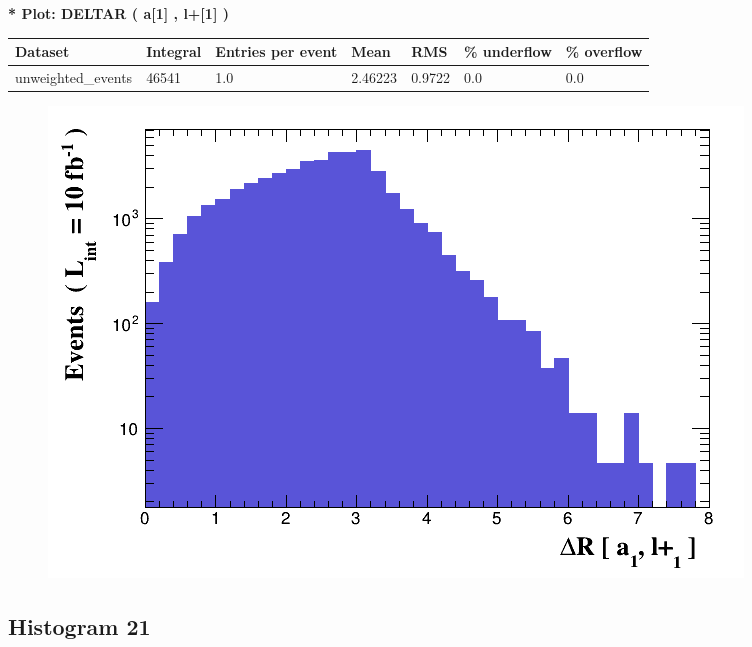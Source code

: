 \documentclass[a4paper, 10pt]{article}
\begin{document}
\textbf{* Plot: DELTAR ( a[1] , l+[1] ) }\\
   \begin{table}[H]
  \begin{center}
    \begin{tabular}{|m{23.0mm}|m{23.0mm}|m{18.0mm}|m{19.0mm}|m{19.0mm}|m{19.0mm}|m{19.0mm}|}
      \hline
      {\cellcolor{yellow}         Dataset}& {\cellcolor{yellow}         Integral}& {\cellcolor{yellow}         Entries per event}& {\cellcolor{yellow}         Mean}& {\cellcolor{yellow}         RMS}& {\cellcolor{yellow}         \% underflow}& {\cellcolor{yellow}         \% overflow}\\
      \hline
      {\cellcolor{white}         unweighted\_events}& {\cellcolor{white}         46541}& {\cellcolor{white}         1.0}& {\cellcolor{white}         2.46223}& {\cellcolor{white}         0.9722}& {\cellcolor{green}         0.0}& {\cellcolor{green}         0.0}\\
\hline
    \end{tabular}
  \end{center}
\end{table}

\begin{figure}[H]
  \begin{center}
    \includegraphics[scale=0.45]{selection_19.png}\\
\caption{   }
  \end{center}
\end{figure}
      \newpage
\subsection{ Histogram 21}
\end{document}
